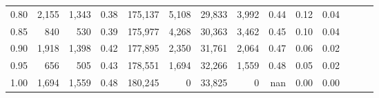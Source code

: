 \begin{tabular}{rrrrrrrrrrrrrr}
0.80 &   2,155 &  1,343 &  0.38 &  175,137 &    5,108 &  29,833 &   3,992 &  0.44 &  0.12 &      0.04 \\
0.85 &     840 &    530 &  0.39 &  175,977 &    4,268 &  30,363 &   3,462 &  0.45 &  0.10 &      0.04 \\
0.90 &   1,918 &  1,398 &  0.42 &  177,895 &    2,350 &  31,761 &   2,064 &  0.47 &  0.06 &      0.02 \\
0.95 &     656 &    505 &  0.43 &  178,551 &    1,694 &  32,266 &   1,559 &  0.48 &  0.05 &      0.02 \\
1.00 &   1,694 &  1,559 &  0.48 &  180,245 &        0 &  33,825 &       0 &   nan &  0.00 &      0.00 \\
\bottomrule
\end{tabular}

